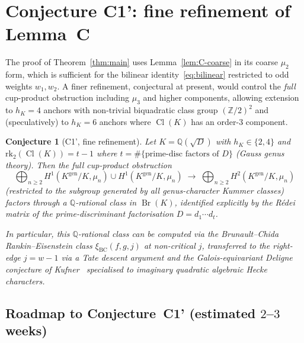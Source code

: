 \documentclass[11pt,a4paper]{amsart}
\theoremstyle{plain}
\newtheorem{conjecture}[theorem]{Conjecture}
\theoremstyle{definition}
\DeclareMathOperator{\Cl}{Cl}
\DeclareMathOperator{\Br}{Br}
\newcommand{\Q}{\mathbb{Q}}
\newcommand{\Z}{\mathbb{Z}}
\newcommand{\Kgen}{K^{\mathrm{gen}}}
\begin{document}
\section{Conjecture C1': fine refinement of Lemma~C}\label{sec:C1prime}

The proof of Theorem~\ref{thm:main} uses Lemma~\ref{lem:C-coarse} in
its coarse $\mu_2$ form, which is sufficient for the bilinear
identity~\eqref{eq:bilinear} restricted to odd weights $w_1, w_2$.  A
finer refinement, conjectural at present, would control the
\emph{full} cup-product obstruction including $\mu_3$ and higher
components, allowing extension to $h_K = 4$ anchors with non-trivial
biquadratic class group $(\Z/2)^2$ and (speculatively) to
$h_K = 6$ anchors where $\Cl(K)$ has an order-$3$ component.

\begin{conjecture}[C1', fine refinement]\label{conj:C1prime}
Let $K = \Q(\sqrt{D})$ with $h_K \in \{2, 4\}$ and
$\mathrm{rk}_2(\Cl(K)) = t - 1$ where $t = \#\{\text{prime-disc factors of } D\}$
\textup{(}Gauss genus theory\textup{)}.  Then the full cup-product
obstruction
\[
   \bigoplus_{n \ge 2}
   H^1(\Kgen/K, \mu_n) \cup H^1(\Kgen/K, \mu_n)
   \;\longrightarrow\;
   \bigoplus_{n \ge 2}
   H^2(\Kgen/K, \mu_n)
\]
\textup{(}restricted to the subgroup generated by all
genus-character Kummer classes\textup{)} factors through a
$\Q$-rational class in $\Br(K)$, identified explicitly by the
R\'edei matrix of the prime-discriminant factorisation
$D = d_1 \cdots d_t$.

In particular, this $\Q$-rational class can be computed via the
Brunault--Chida~\cite{BrunaultChida2015} Rankin--Eisenstein class
$\xi_{\mathrm{BC}}(f, g, j)$ at non-critical $j$, transferred to the
right-edge $j = w-1$ via a Tate descent argument and the
Galois-equivariant Deligne conjecture of Kufner~\cite{Kufner2024}
specialised to imaginary quadratic algebraic Hecke characters.
\end{conjecture}

\subsection*{Roadmap to Conjecture~C1' (estimated $2$--$3$ weeks)}
\end{document}
